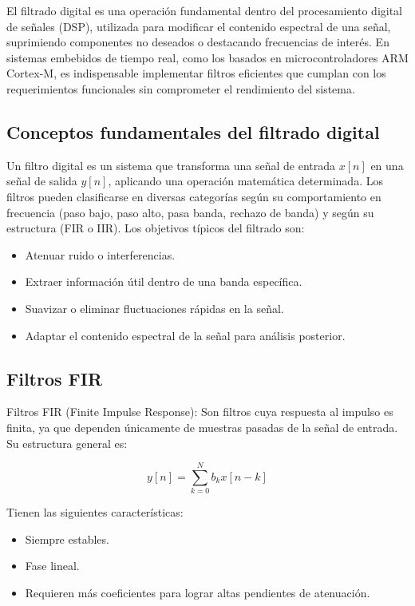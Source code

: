 \documentclass[12pt]{article}
\begin{document}
	El filtrado digital es una operación fundamental dentro del procesamiento digital de señales (DSP), utilizada para modificar el contenido espectral de una señal, suprimiendo componentes no deseados o destacando frecuencias de interés. En sistemas embebidos de tiempo real, como los basados en microcontroladores ARM Cortex-M, es indispensable implementar filtros eficientes que cumplan con los requerimientos funcionales sin comprometer el rendimiento del sistema.
	
	\subsection{Conceptos fundamentales del filtrado digital}
	
	Un filtro digital es un sistema que transforma una señal de entrada $x[n]$ en una señal de salida $y[n]$, aplicando una operación matemática determinada. Los filtros pueden clasificarse en diversas categorías según su comportamiento en frecuencia (paso bajo, paso alto, pasa banda, rechazo de banda) y según su estructura (FIR o IIR). Los objetivos típicos del filtrado son:
	
	\begin{itemize}
		\item Atenuar ruido o interferencias.
		\item Extraer información útil dentro de una banda específica.
		\item Suavizar o eliminar fluctuaciones rápidas en la señal.
		\item Adaptar el contenido espectral de la señal para análisis posterior.
	\end{itemize}
	
	\subsection{Filtros FIR}
	
	Filtros FIR (Finite Impulse Response): Son filtros cuya respuesta al impulso es finita, ya que dependen únicamente de muestras pasadas de la señal de entrada. Su estructura general es:
	
	\begin{equation}
		y[n] = \sum_{k=0}^{N} b_k x[n-k]
	\end{equation}\newpage
	
	Tienen las siguientes características:
	\begin{itemize}
		\item Siempre estables.
		\item Fase lineal.
		\item Requieren más coeficientes para lograr altas pendientes de atenuación.
	\end{itemize}
	
\end{document}
